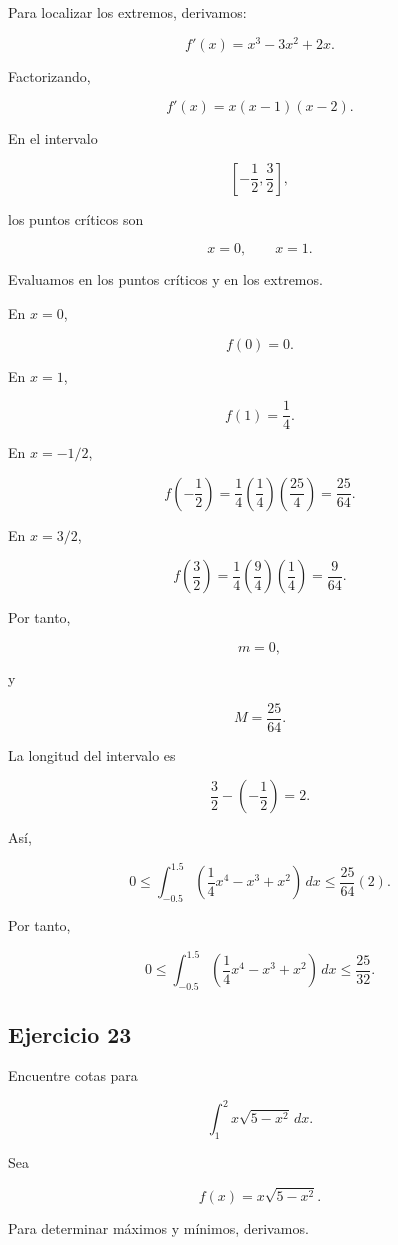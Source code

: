 \documentclass[12pt]{article}
\begin{document}
Para localizar los extremos, derivamos:

\[
f'(x)
=
x^3-3x^2+2x.
\]

Factorizando,

\[
f'(x)=x(x-1)(x-2).
\]

En el intervalo

\[
\left[-\frac12,\frac32\right],
\]

los puntos críticos son

\[
x=0,
\qquad
x=1.
\]

Evaluamos en los puntos críticos y en los extremos.

En \(x=0\),

\[
f(0)=0.
\]

En \(x=1\),

\[
f(1)=\frac14.
\]

En \(x=-1/2\),

\[
f\left(-\frac12\right)
=
\frac14
\left(\frac14\right)
\left(\frac{25}{4}\right)
=
\frac{25}{64}.
\]

En \(x=3/2\),

\[
f\left(\frac32\right)
=
\frac14
\left(\frac94\right)
\left(\frac14\right)
=
\frac9{64}.
\]

Por tanto,

\[
m=0,
\]

y

\[
M=\frac{25}{64}.
\]

La longitud del intervalo es

\[
\frac32-\left(-\frac12\right)=2.
\]

Así,

\[
0
\leq
\int_{-0.5}^{1.5}
\left(
\frac14x^4-x^3+x^2
\right)\,dx
\leq
\frac{25}{64}(2).
\]

Por tanto,

\[
\boxed{
0
\leq
\int_{-0.5}^{1.5}
\left(
\frac14x^4-x^3+x^2
\right)\,dx
\leq
\frac{25}{32}
}.
\]

\subsection*{Ejercicio 23}

Encuentre cotas para

\[
\int_1^2x\sqrt{5-x^2}\,dx.
\]

Sea

\[
f(x)=x\sqrt{5-x^2}.
\]

Para determinar máximos y mínimos, derivamos.
\end{document}
